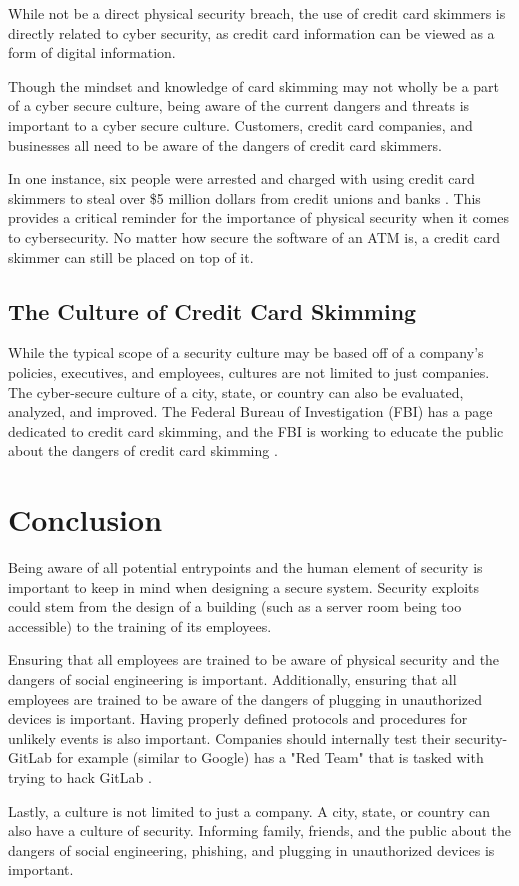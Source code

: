 \documentclass[acmsmall]{acmart}
\begin{document}
While not be a direct physical security breach, the use of credit card skimmers
is directly related to cyber security, as credit card information can be viewed
as a form of digital information.

Though the mindset and knowledge of card skimming may not wholly be a part of a
cyber secure culture, being aware of the current dangers and threats is important
to a cyber secure culture. Customers, credit card companies, and businesses all
need to be aware of the dangers of credit card skimmers.

In one instance, six people were arrested and charged with using credit card skimmers
to steal over \$5 million dollars from credit unions and banks \cite{FBISkimming}.
This provides a critical reminder for the importance of physical security when it comes
to cybersecurity. No matter how secure the software of an ATM is, a credit card skimmer
can still be placed on top of it.

\subsection{The Culture of Credit Card Skimming}
While the typical scope of a security culture may be based off of a company's
policies, executives, and employees, cultures are not limited to just companies.
The cyber-secure culture of a city, state, or country can also be evaluated,
analyzed, and improved. The Federal Bureau of Investigation (FBI) has a page
dedicated to credit card skimming, and the FBI is working to educate the public
about the dangers of credit card skimming \cite{FBISkimming}.

\section{Conclusion}
Being aware of all potential entrypoints and the human element of security is important
to keep in mind when designing a secure system. Security exploits could stem from the
design of a building (such as a server room being too accessible) to the training of
its employees.

Ensuring that all employees are trained to be aware of physical security and the dangers
of social engineering is important. Additionally, ensuring that all employees are trained
to be aware of the dangers of plugging in unauthorized devices is important. Having properly
defined protocols and procedures for unlikely events is also important.
Companies should internally test their security- GitLab for example (similar to Google) has a
"Red Team" that is tasked with trying to hack GitLab \cite{GitLab}.

Lastly, a culture is not limited to just a company. A city, state, or country can also
have a culture of security. Informing family, friends, and the public about the dangers
of social engineering, phishing, and plugging in unauthorized devices is important.



\end{document}
